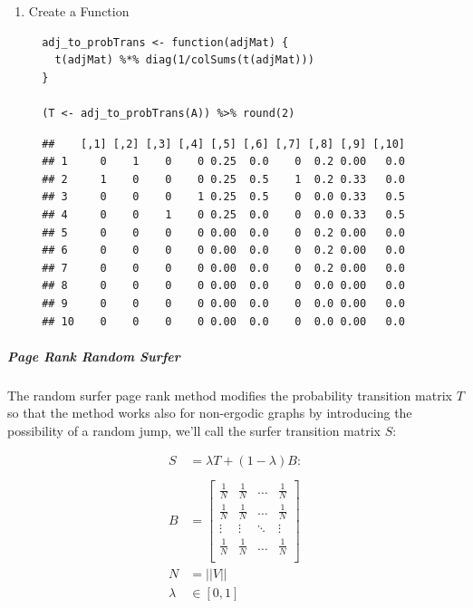 \documentclass[11pt]{article}
\begin{document}
\begin{enumerate}
\begin{enumerate}
\item Create a Function
\label{create-a-function}
\begin{verbatim}
  adj_to_probTrans <- function(adjMat) {
    t(adjMat) %*% diag(1/colSums(t(adjMat)))
  }

  (T <- adj_to_probTrans(A)) %>% round(2)
\end{verbatim}

\begin{verbatim}
  ##    [,1] [,2] [,3] [,4] [,5] [,6] [,7] [,8] [,9] [,10]
  ## 1     0    1    0    0 0.25  0.0    0  0.2 0.00   0.0
  ## 2     1    0    0    0 0.25  0.5    1  0.2 0.33   0.0
  ## 3     0    0    0    1 0.25  0.5    0  0.0 0.33   0.5
  ## 4     0    0    1    0 0.25  0.0    0  0.0 0.33   0.5
  ## 5     0    0    0    0 0.00  0.0    0  0.2 0.00   0.0
  ## 6     0    0    0    0 0.00  0.0    0  0.2 0.00   0.0
  ## 7     0    0    0    0 0.00  0.0    0  0.2 0.00   0.0
  ## 8     0    0    0    0 0.00  0.0    0  0.0 0.00   0.0
  ## 9     0    0    0    0 0.00  0.0    0  0.0 0.00   0.0
  ## 10    0    0    0    0 0.00  0.0    0  0.0 0.00   0.0
\end{verbatim}
\end{enumerate}
\end{enumerate}

\subparagraph{Page Rank Random Surfer}
\label{page-rank-random-surfer}
The random surfer page rank method modifies the probability transition
matrix \(T\) so that the method works also for non-ergodic graphs by
introducing the possibility of a random jump, we'll call the surfer
transition matrix \(S\):

\begin{align}
    S &= \lambda T +  \left( 1- \lambda \right)B :\\
\ \\
    B&= \begin{bmatrix}
    \frac{1}{N} & \frac{1}{N} & \ldots & \frac{1}{N} \\
    \frac{1}{N} & \frac{1}{N} & \ldots & \frac{1}{N} \\
        \vdots      & \vdots      & \ddots & \vdots  \\
    \frac{1}{N} & \frac{1}{N} & \ldots & \frac{1}{N} \\
    \end{bmatrix} \label{eq:bgval1} \\
    N&= \left| \left| V \right| \right| \\
    \lambda &\in [0,1]
\end{align}
\end{document}
